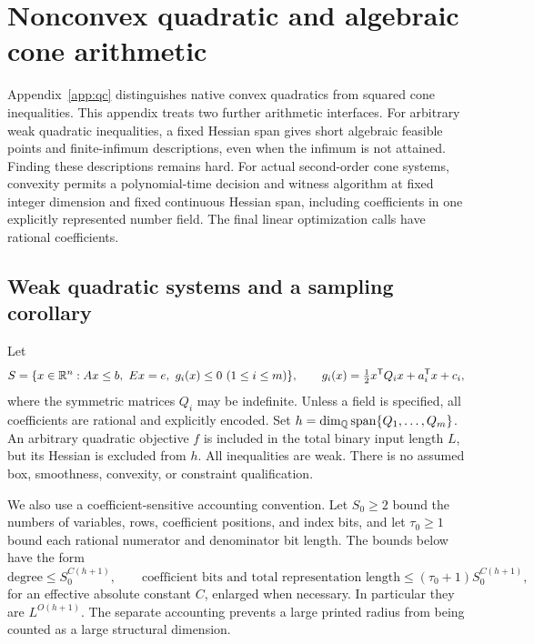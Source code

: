 \section{Nonconvex quadratic and algebraic cone arithmetic}
\label{app:further-arithmetic}

Appendix~\ref{app:qc} distinguishes native convex quadratics from squared
cone inequalities. This appendix treats two further arithmetic interfaces.
For arbitrary weak quadratic inequalities, a fixed Hessian span gives short
algebraic feasible points and finite-infimum descriptions, even when the
infimum is not attained. Finding these descriptions remains hard. For actual
second-order cone systems, convexity permits a polynomial-time decision and
witness algorithm at fixed integer dimension and fixed continuous Hessian
span, including coefficients in one explicitly represented number field.
The final linear optimization calls have rational coefficients.

\subsection{Weak quadratic systems and a sampling corollary}
\label{app:ncq-setting}

Let
\begin{equation}
\label{eq:ncq-system}
 S=\{x\in\mathbb R^n:Ax\le b,\ Ex=e,\ g_i(x)\le0\ (1\le i\le m)\},
 \qquad g_i(x)=\tfrac12x^{\mathsf T}Q_ix+a_i^{\mathsf T}x+c_i,
\end{equation}
where the symmetric matrices $Q_i$ may be indefinite. Unless a field is
specified, all coefficients are rational and explicitly encoded. Set
$h=\dim_{\mathbb Q}\operatorname{span}\{Q_1,\ldots,Q_m\}$. An arbitrary quadratic objective
$f$ is included in the total binary input length $L$, but its Hessian is
excluded from $h$. All inequalities are weak. There is no assumed box,
smoothness, convexity, or constraint qualification.

We also use a coefficient-sensitive accounting convention. Let $S_0\ge2$
bound the numbers of variables, rows, coefficient positions, and index bits,
and let $\tau_0\ge1$ bound each rational numerator and denominator bit
length. The bounds below have the form
\begin{equation}
\label{eq:ncq-budget}
 \text{degree}\le S_0^{C(h+1)},\qquad
 \text{coefficient bits and total representation length}
       \le(\tau_0+1)S_0^{C(h+1)},
\end{equation}
for an effective absolute constant $C$, enlarged when necessary. In
particular they are $L^{O(h+1)}$. The separate accounting prevents a large
printed radius from being counted as a large structural dimension.

